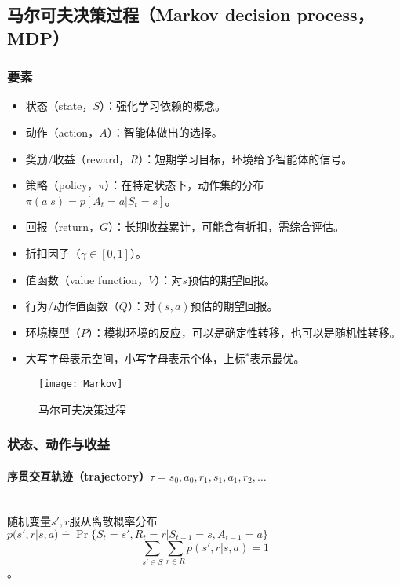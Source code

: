 \documentclass[
12pt, %
a4paper, 
oneside, %
headinclude,footinclude, %
]{scrartcl}
\begin{document}
\subsection[马尔可夫决策过程]{马尔可夫决策过程（Markov decision process，MDP）}
\subsubsection[要素]{要素}
\begin{itemize}
\item 状态（state，$ S $）：强化学习依赖的概念。
\item 动作（action，$ A $）：智能体做出的选择。
\item 奖励/收益（reward，$ R $）：短期学习目标，环境给予智能体的信号。
\item 策略（policy，$ \pi $）：在特定状态下，动作集的分布$ \pi(a|s) = p[A_t = a|S_t = s] $。
\item 回报（return，$ G $）：长期收益累计，可能含有折扣，需综合评估。
\item 折扣因子（$ \gamma \in [0, 1] $）。
\item 值函数（value function，$ V $）：对$ s $预估的期望回报。
\item 行为/动作值函数（$ Q $）：对$ (s, a) $预估的期望回报。
\item 环境模型（$ P $）：模拟环境的反应，可以是确定性转移，也可以是随机性转移。
\item 大写字母表示空间，小写字母表示个体，上标$ ^* $表示最优。
\end{itemize}

\begin{figure}[H]
\centering 
\texttt{[image: Markov]} 
\caption{马尔可夫决策过程}
\end{figure}
\subsubsection[状态、动作与收益]{状态、动作与收益}
\paragraph{序贯交互轨迹（trajectory）$ \tau =  s_0, a_0, r_1, s_1, a_1, r_2, \dots $}~\\

随机变量$ s',r $服从离散概率分布$ p(s', r|s, a) \doteq \Pr\{S_t = s', R_t = r|S_{t - 1} = s, A_{t - 1} = a\} $
$$ \sum_{s' \in S}\sum_{r \in R} p(s', r|s, a) = 1 $$。
\end{document}
